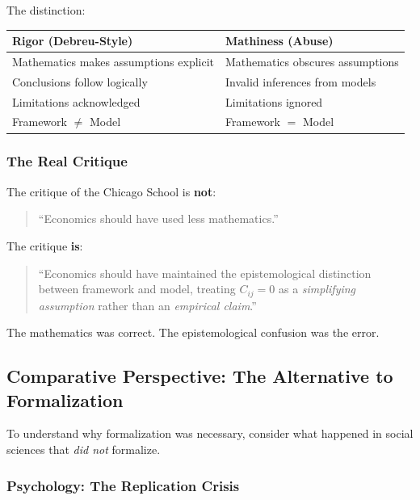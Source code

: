The distinction:
\begin{center}
\renewcommand{\arraystretch}{1.3}
\begin{tabular}{@{}p{5.5cm}p{5.5cm}@{}}
\toprule
\textbf{Rigor (Debreu-Style)} & \textbf{Mathiness (Abuse)} \\
\midrule
Mathematics makes assumptions explicit & Mathematics obscures assumptions \\
Conclusions follow logically & Invalid inferences from models \\
Limitations acknowledged & Limitations ignored \\
Framework $\neq$ Model & Framework $=$ Model \\
\bottomrule
\end{tabular}
\end{center}

\subsubsection{The Real Critique}

The critique of the Chicago School is \textbf{not}:
\begin{quote}
``Economics should have used less mathematics.''
\end{quote}

The critique \textbf{is}:
\begin{quote}
``Economics should have maintained the epistemological distinction between
framework and model, treating $C_{ij} = 0$ as a \textit{simplifying assumption}
rather than an \textit{empirical claim}.''
\end{quote}

The mathematics was correct. The epistemological confusion was the error.



\subsection{Comparative Perspective: The Alternative to Formalization}
\label{sec:meta-comparative}

To understand why formalization was necessary, consider what happened in
social sciences that \textit{did not} formalize.

\subsubsection{Psychology: The Replication Crisis}

